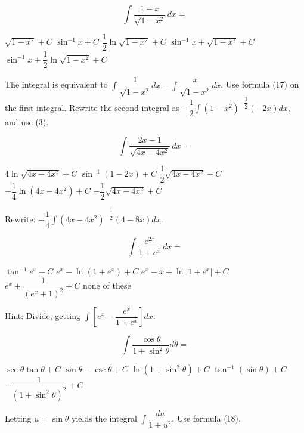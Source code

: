 \question
\[
\displaystyle\int \dfrac{1-x}{\sqrt{1-x^{2}}} \,dx=
\]
\begin{choices}
  \choice $\sqrt{1-x^{2}}+C$
  \choice $\sin ^{-1} x+C$
  \choice $\dfrac{1}{2} \ln \sqrt{1-x^{2}}+C$
  \CorrectChoice $\sin ^{-1} x+\sqrt{1-x^{2}}+C$
  \choice $\sin ^{-1} x+\dfrac{1}{2} \ln \sqrt{1-x^{2}}+C$
\end{choices}
\begin{solution}
The integral is equivalent to $\displaystyle\int \dfrac{1}{\sqrt{1-x^{2}}} d x-\displaystyle\int \dfrac{x}{\sqrt{1-x^{2}}} d x$. Use formula (17) on the first integral. Rewrite the second integral as $-\dfrac{1}{2} \displaystyle\int\left(1-x^{2}\right)^{-\dfrac{1}{2}}(-2 x) d x$, and use (3).
\end{solution}

\question
\[
\displaystyle\int \dfrac{2 x-1}{\sqrt{4 x-4 x^{2}}} \,dx=
\]
\begin{choices}
  \choice $4 \ln \sqrt{4 x-4 x^{2}}+C$
  \choice $\sin ^{-1}(1-2 x)+C$
  \choice $\dfrac{1}{2} \sqrt{4 x-4 x^{2}}+C$
  \choice $-\dfrac{1}{4} \ln \left(4 x-4 x^{2}\right)+C$
  \CorrectChoice $-\dfrac{1}{2} \sqrt{4 x-4 x^{2}}+C$
\end{choices}
\begin{solution}
Rewrite: $-\dfrac{1}{4} \displaystyle\int\left(4 x-4 x^{2}\right)^{-\dfrac{1}{2}}(4-8 x) d x$.
\end{solution}


\newpage




\question
\[
\displaystyle\int \dfrac{e^{2 x}}{1+e^{x}} \,dx=
\]
\begin{choices}
  \choice $\tan ^{-1} e^{x}+C$
  \CorrectChoice $e^{x}-\ln \left(1+e^{x}\right)+C$
  \choice $e^{x}-x+\ln \left|1+e^{x}\right|+C$
  \choice $e^{x}+\dfrac{1}{\left(e^{x}+1\right)^{2}}+C$
  \choice none of these
\end{choices}
\begin{solution}
Hint: Divide, getting $\displaystyle\int\left[e^{x}-\dfrac{e^{x}}{1+e^{x}}\right] d x$.
\end{solution}

\question
\[
\displaystyle\int \dfrac{\cos \theta}{1+\sin ^{2} \theta} d \theta=
\]
\begin{choices}
  \choice $\sec \theta \tan \theta+C$
  \choice $\sin \theta-\csc \theta+C$
  \choice $\ln \left(1+\sin ^{2} \theta\right)+C$
  \CorrectChoice $\tan ^{-1}(\sin \theta)+C$
  \choice $-\dfrac{1}{\left(1+\sin ^{2} \theta\right)^{2}}+C$
\end{choices}
\begin{solution}
Letting $u=\sin \theta$ yields the integral $\displaystyle\int \dfrac{d u}{1+u^{2}}$. Use formula (18).
\end{solution}

